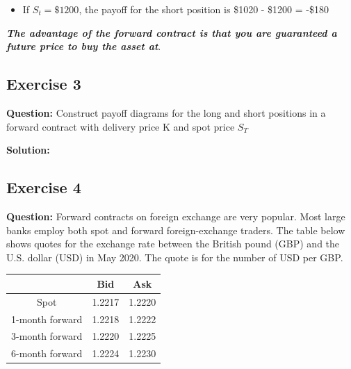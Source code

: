 \documentclass{article}
\begin{document}
  \begin{itemize}
     \item If $S_t = \$1200$, the payoff for the short position is \$1020 - \$1200 = -\$180
 \end{itemize}

\noindent \textbf{\textit{The advantage of the forward contract is that you are guaranteed a future price to buy the asset at}}.


\subsection*{Exercise 3}

\textbf{Question:} Construct payoff diagrams for the long and short positions in a forward contract with delivery price K and spot price $S_T$

\textbf{Solution:}


\subsection*{Exercise 4}

\textbf{Question:}  Forward contracts on foreign exchange are very popular. Most large banks employ both spot and forward foreign-exchange traders. The table below shows quotes for the exchange rate between the British pound (GBP) and the U.S. dollar (USD) in May 2020. The quote is for the number of USD per GBP.

\begin{table}[htbp]
  \centering
  \label{tab:example}
  \begin{tabular}{|c|c|c|}
    \hline
     & Bid & Ask \\
    \hline
    Spot & 1.2217 & 1.2220  \\
    \hline
    1-month forward & 1.2218 & 1.2222 \\
    \hline
    3-month forward & 1.2220 & 1.2225 \\
    \hline
    6-month forward & 1.2224 & 1.2230 \\
    \hline
  \end{tabular}
\end{table}
\end{document}
